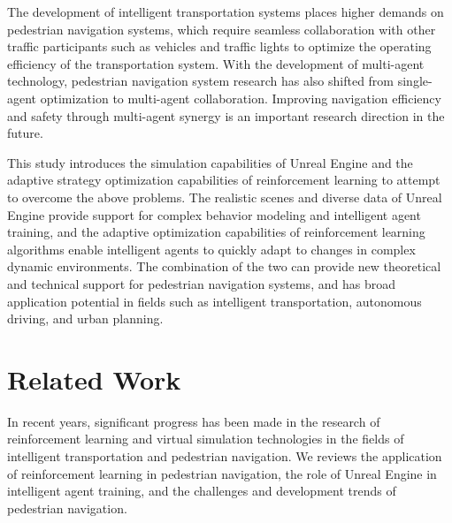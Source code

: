 \documentclass[lettersize,journal]{IEEEtran}
\begin{document}
The development of intelligent transportation systems places higher demands on pedestrian navigation systems, which require seamless collaboration with other traffic participants such as vehicles and traffic lights to optimize the operating efficiency of the transportation system. 
With the development of multi-agent technology, pedestrian navigation system research has also shifted from single-agent optimization to multi-agent collaboration. 
Improving navigation efficiency and safety through multi-agent synergy is an important research direction in the future.


This study introduces the simulation capabilities of Unreal Engine and the adaptive strategy optimization capabilities of reinforcement learning to attempt to overcome the above problems. The realistic scenes and diverse data of Unreal Engine provide support for complex behavior modeling and intelligent agent training, and the adaptive optimization capabilities of reinforcement learning algorithms enable intelligent agents to quickly adapt to changes in complex dynamic environments. The combination of the two can provide new theoretical and technical support for pedestrian navigation systems, and has broad application potential in fields such as intelligent transportation, autonomous driving, and urban planning.


\section{Related Work}

In recent years, significant progress has been made in the research of reinforcement learning and virtual simulation technologies in the fields of intelligent transportation and pedestrian navigation. 
We reviews the application of reinforcement learning in pedestrian navigation, the role of Unreal Engine in intelligent agent training, and the challenges and development trends of pedestrian navigation.
\end{document}

